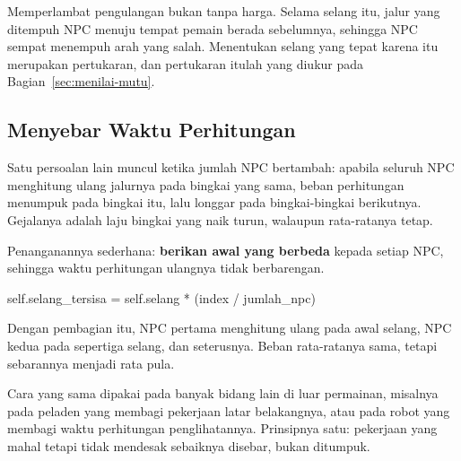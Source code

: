 Memperlambat pengulangan bukan tanpa harga. Selama selang itu,
jalur yang ditempuh NPC menuju tempat pemain berada sebelumnya, sehingga NPC
sempat menempuh arah yang salah. Menentukan selang yang tepat karena itu
merupakan pertukaran, dan pertukaran itulah yang diukur pada
Bagian~\ref{sec:menilai-mutu}.

\subsection{Menyebar Waktu Perhitungan}

Satu persoalan lain muncul ketika jumlah NPC bertambah: apabila seluruh NPC
menghitung ulang jalurnya pada bingkai yang sama, beban perhitungan menumpuk
pada bingkai itu, lalu longgar pada bingkai-bingkai berikutnya. Gejalanya
adalah laju bingkai yang naik turun, walaupun rata-ratanya tetap.

Penanganannya sederhana: \textbf{berikan awal yang berbeda} kepada setiap NPC,
sehingga waktu perhitungan ulangnya tidak berbarengan.

\begin{kodekeluaran}
self.selang_tersisa = self.selang * (index / jumlah_npc)
\end{kodekeluaran}

Dengan pembagian itu, NPC pertama menghitung ulang pada awal selang, NPC kedua
pada sepertiga selang, dan seterusnya. Beban rata-ratanya sama, tetapi
sebarannya menjadi rata pula.

\begin{tipsbox}
Cara yang sama dipakai pada banyak bidang lain di luar permainan, misalnya
pada peladen yang membagi pekerjaan latar belakangnya, atau pada robot yang
membagi waktu perhitungan penglihatannya. Prinsipnya satu: pekerjaan yang
mahal tetapi tidak mendesak sebaiknya disebar, bukan ditumpuk.
\end{tipsbox}
